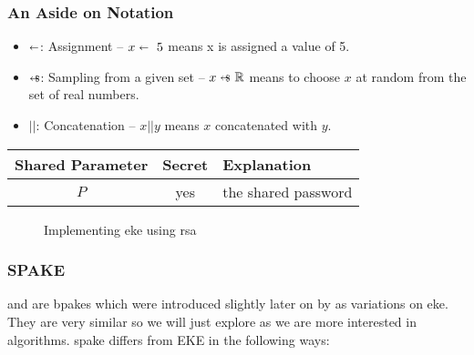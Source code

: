 \subsubsection{An Aside on Notation}
\begin{itemize}
  \item $\shortleftarrow$: Assignment -- $x \shortleftarrow \ 5$ means x is assigned a value of 5.
  \item $\shortleftarrow\kern-1.5ex\text{\scriptsize \$}$: Sampling from a given set -- $x \cryptoSample \ \mathbb{R}$ means to choose $x$ at random from the set of real numbers.
  \item $||$: Concatenation -- $x || y$ means $x$ concatenated with $y$.
\end{itemize}

\begin{center}
  \begin{tabular}{ ccl }
    \toprule
    Shared Parameter & Secret & Explanation \\
    \midrule
    $P$ & yes & the shared password \\
    \bottomrule
  \end{tabular}
\end{center}

\begin{figure}[H]

  \caption{Implementing \gls{eke} using \gls{rsa}}
  \label{fig:eke-rsa}
\end{figure}

\clearpage

\subsubsection{SPAKE}
 and  are \glspl{bpake} which were introduced slightly later on by \citeauthor{spake} \cite{spake} as variations on \gls{eke}.
They are very similar so we will just explore  as we are more interested in  algorithms.
\gls{spake} differs from EKE in the following ways:

